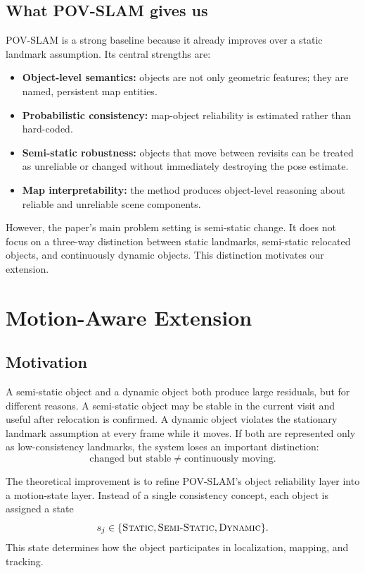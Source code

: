 ﻿\documentclass[11pt]{article}
\newcommand{\Static}{\textsc{Static}}
\newcommand{\SemiStatic}{\textsc{Semi-Static}}
\newcommand{\Dynamic}{\textsc{Dynamic}}
\begin{document}
\subsection{What POV-SLAM gives us}
POV-SLAM is a strong baseline because it already improves over a static landmark assumption. Its central strengths are:
\begin{itemize}[leftmargin=*]
    \item \textbf{Object-level semantics:} objects are not only geometric features; they are named, persistent map entities.
    \item \textbf{Probabilistic consistency:} map-object reliability is estimated rather than hard-coded.
    \item \textbf{Semi-static robustness:} objects that move between revisits can be treated as unreliable or changed without immediately destroying the pose estimate.
    \item \textbf{Map interpretability:} the method produces object-level reasoning about reliable and unreliable scene components.
\end{itemize}

However, the paper's main problem setting is semi-static change. It does not focus on a three-way distinction between static landmarks, semi-static relocated objects, and continuously dynamic objects. This distinction motivates our extension.

\section{Motion-Aware Extension}
\subsection{Motivation}
A semi-static object and a dynamic object both produce large residuals, but for different reasons. A semi-static object may be stable in the current visit and useful after relocation is confirmed. A dynamic object violates the stationary landmark assumption at every frame while it moves. If both are represented only as low-consistency landmarks, the system loses an important distinction:
\begin{equation}
    \text{changed but stable} \neq \text{continuously moving}.
\end{equation}

The theoretical improvement is to refine POV-SLAM's object reliability layer into a motion-state layer. Instead of a single consistency concept, each object is assigned a state
\begin{equation}
    s_j \in \{\Static, \SemiStatic, \Dynamic\}.
\end{equation}
This state determines how the object participates in localization, mapping, and tracking.
\end{document}
